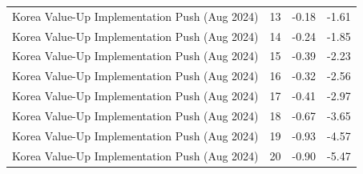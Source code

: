\begin{table}
\begin{tabular}{lrrr}
Korea Value-Up Implementation Push (Aug 2024) & 13 & -0.18 & -1.61 \\
Korea Value-Up Implementation Push (Aug 2024) & 14 & -0.24 & -1.85 \\
Korea Value-Up Implementation Push (Aug 2024) & 15 & -0.39 & -2.23 \\
Korea Value-Up Implementation Push (Aug 2024) & 16 & -0.32 & -2.56 \\
Korea Value-Up Implementation Push (Aug 2024) & 17 & -0.41 & -2.97 \\
Korea Value-Up Implementation Push (Aug 2024) & 18 & -0.67 & -3.65 \\
Korea Value-Up Implementation Push (Aug 2024) & 19 & -0.93 & -4.57 \\
Korea Value-Up Implementation Push (Aug 2024) & 20 & -0.90 & -5.47 \\
\bottomrule
\end{tabular}
\end{table}

